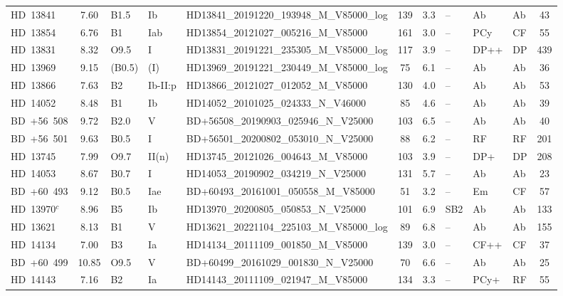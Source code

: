 {\begin{landscape}
\begin{longtable}{lclllcclllc}
\noalign{\smallskip}
HD~13841 & 7.60 & B1.5 & Ib & HD13841\_20191220\_193948\_M\_V85000\_log & 139 & 3.3 & -- & Ab & Ab & 43 \\
\noalign{\smallskip}
HD~13854 & 6.76 & B1 & Iab & HD13854\_20121027\_005216\_M\_V85000 & 161 & 3.0 & -- & PCy & CF & 55 \\
\noalign{\smallskip}
HD~13831 & 8.32 & O9.5 & I & HD13831\_20191221\_235305\_M\_V85000\_log & 117 & 3.9 & -- & DP++ & DP & 439 \\
\noalign{\smallskip}
HD~13969 & 9.15 & (B0.5) & (I) & HD13969\_20191221\_230449\_M\_V85000\_log & 75 & 6.1 & -- & Ab & Ab & 36 \\
\noalign{\smallskip}
HD~13866 & 7.63 & B2 & Ib-II:p & HD13866\_20121027\_012052\_M\_V85000 & 130 & 4.0 & -- & Ab & Ab & 53 \\
\noalign{\smallskip}
HD~14052 & 8.48 & B1 & Ib & HD14052\_20101025\_024333\_N\_V46000 & 85 & 4.6 & -- & Ab & Ab & 39 \\
\noalign{\smallskip}
BD~+56~508 & 9.72 & B2.0 & V & BD+56508\_20190903\_025946\_N\_V25000 & 103 & 6.5 & -- & Ab & Ab & 40 \\
\noalign{\smallskip}
BD~+56~501 & 9.63 & B0.5 & I & BD+56501\_20200802\_053010\_N\_V25000 & 88 & 6.2 & -- & RF & RF & 201 \\
\noalign{\smallskip}
HD~13745 & 7.99 & O9.7 & II(n) & HD13745\_20121026\_004643\_M\_V85000 & 103 & 3.9 & -- & DP+ & DP & 208 \\
\noalign{\smallskip}
HD~14053 & 8.67 & B0.7 & I & HD14053\_20190902\_034219\_N\_V25000 & 131 & 5.7 & -- & Ab & Ab & 23 \\
\noalign{\smallskip}
BD~+60~493 & 9.12 & B0.5 & Iae & BD+60493\_20161001\_050558\_M\_V85000 & 51 & 3.2 & -- & Em & CF & 57 \\
\noalign{\smallskip}
HD~13970$^{c}$ & 8.96 & B5 & Ib & HD13970\_20200805\_050853\_N\_V25000 & 101 & 6.9 & SB2 & Ab & Ab & 133 \\
\noalign{\smallskip}
HD~13621 & 8.13 & B1 & V & HD13621\_20221104\_225103\_M\_V85000\_log & 89 & 6.8 & -- & Ab & Ab & 155 \\
\noalign{\smallskip}
HD~14134 & 7.00 & B3 & Ia & HD14134\_20111109\_001850\_M\_V85000 & 139 & 3.0 & -- & CF++ & CF & 37 \\
\noalign{\smallskip}
BD~+60~499 & 10.85 & O9.5 & V & BD+60499\_20161029\_001830\_N\_V25000 & 70 & 6.6 & -- & Ab & Ab & 25 \\
\noalign{\smallskip}
HD~14143 & 7.16 & B2 & Ia & HD14143\_20111109\_021947\_M\_V85000 & 134 & 3.3 & -- & PCy+ & RF & 55 \\

\end{longtable}
\end{landscape}}

